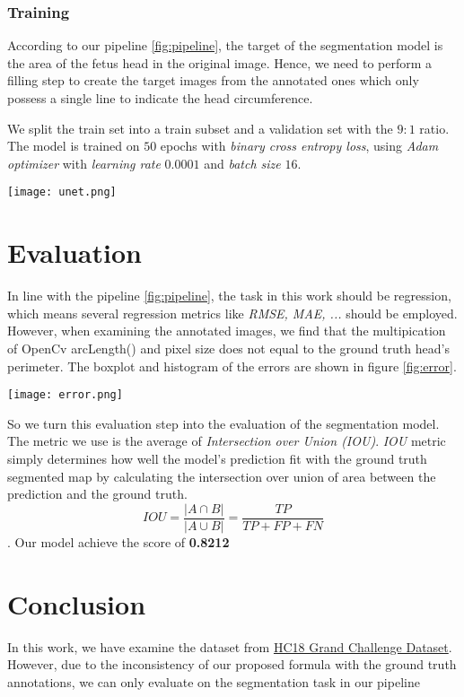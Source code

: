 \documentclass[conference]{IEEEtran}
\begin{document}
\subsubsection{Training}
According to our pipeline \ref{fig:pipeline}, the target of the segmentation model is the area of the fetus head in the original image. Hence, we need to perform a filling step to create the target images from the annotated ones which only possess a single line to indicate the head circumference.

We split the train set into a train subset and a validation set with the $9:1$ ratio. The model is trained on $50$ epochs with \emph{binary cross entropy loss}, using \emph{Adam optimizer} with \emph{learning rate} $0.0001$ and \emph{batch size} $16$.

\begin{figure*}
    \centering
    \texttt{[image: unet.png]}
    \caption{Model architecture}
    \label{fig:unet}
\end{figure*}

\section{Evaluation}
In line with the pipeline \ref{fig:pipeline}, the task in this work should be regression, which means several regression metrics like \emph{RMSE, MAE, ...} should be employed. However, when examining the annotated images, we find that the multipication of OpenCv arcLength() and pixel size does not equal to the ground truth head's perimeter. The boxplot and histogram of the errors are shown in figure \ref{fig:error}.
\begin{figure*}
    \centering
    \texttt{[image: error.png]}
    \caption{Errors between proposed formula and ground truth perimeter value}
    \label{fig:error}
\end{figure*}

So we turn this evaluation step into the evaluation of the segmentation model. The metric we use is the average of \emph{Intersection over Union (IOU)}. \emph{IOU} metric simply determines how well the model's prediction fit with the ground truth segmented map by calculating the intersection over union of area between the prediction and the ground truth. \[IOU=\frac{|A \cap B|}{|A \cup B|}=\frac{TP}{TP+FP+FN}\]. Our model achieve the score of \textbf{0.8212}

\section{Conclusion}
In this work, we have examine the dataset from \href{https://hc18.grand-challenge.org/}{HC18 Grand Challenge Dataset}. However, due to the inconsistency of our proposed formula with the ground truth annotations, we can only evaluate on the segmentation task in our pipeline

\printbibliography
\end{document}
